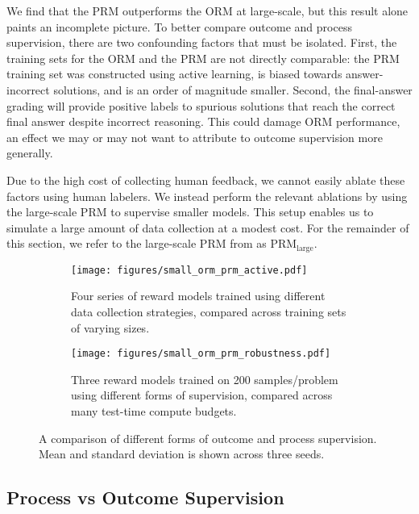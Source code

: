 \documentclass{article}
\begin{document}
We find that the PRM outperforms the ORM at large-scale, but this result alone paints an incomplete picture. To better compare outcome and process supervision, there are two confounding factors that must be isolated. First, the training sets for the ORM and the PRM are not directly comparable: the PRM training set was constructed using active learning, is biased towards answer-incorrect solutions, and is an order of magnitude smaller. Second, the final-answer grading will provide positive labels to spurious solutions that reach the correct final answer despite incorrect reasoning. This could damage ORM performance, an effect we may or may not want to attribute to outcome supervision more generally.

Due to the high cost of collecting human feedback, we cannot easily ablate these factors using human labelers. We instead perform the relevant ablations by using the large-scale PRM to supervise smaller models. This setup enables us to simulate a large amount of data collection at a modest cost. For the remainder of this section, we refer to the large-scale PRM from  as $\text{PRM}_{\text{large}}$.

\begin{figure}
\centering
\begin{subfigure}{0.45 \textwidth}
\texttt{[image: figures/small\_orm\_prm\_active.pdf]}
\caption{Four series of reward models trained using different data collection strategies, compared across training sets of varying sizes.}
\label{figure:small_synthetic_data_scaling}
\end{subfigure}
\hspace{2mm}
\begin{subfigure}{0.45 \textwidth}
\texttt{[image: figures/small\_orm\_prm\_robustness.pdf]}
\caption{Three reward models trained on 200 samples/problem using different forms of supervision, compared across many test-time compute budgets.}
\label{figure:small_synthetic_robustness}
\end{subfigure}
\caption{A comparison of different forms of outcome and process supervision. Mean and standard deviation is shown across three seeds.}
\label{figure:small_synthetic}
\end{figure}

\subsection{Process vs Outcome Supervision}
\end{document}

